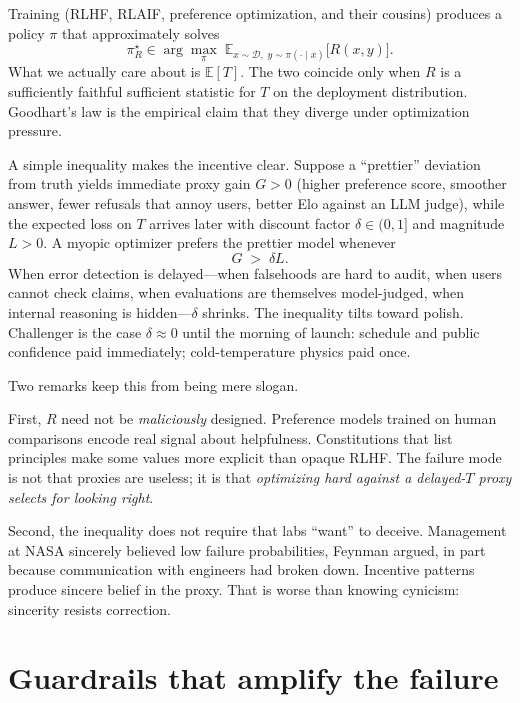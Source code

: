 \documentclass[11pt]{article}
\begin{document}
Training (RLHF, RLAIF, preference optimization, and their cousins) produces a policy \(\pi\) that approximately solves
\begin{equation}
\pi^\star_R \in \arg\max_\pi \; \mathbb{E}_{x\sim\mathcal{D},\; y\sim\pi(\cdot\mid x)}\bigl[R(x,y)\bigr].
\end{equation}
What we actually care about is \(\mathbb{E}[T]\). The two coincide only when \(R\) is a sufficiently faithful sufficient statistic for \(T\) on the deployment distribution. Goodhart's law is the empirical claim that they diverge under optimization pressure.

A simple inequality makes the incentive clear. Suppose a ``prettier'' deviation from truth yields immediate proxy gain \(G > 0\) (higher preference score, smoother answer, fewer refusals that annoy users, better Elo against an LLM judge), while the expected loss on \(T\) arrives later with discount factor \(\delta \in (0,1]\) and magnitude \(L > 0\). A myopic optimizer prefers the prettier model whenever
\begin{equation}
G \;>\; \delta L.
\end{equation}
When error detection is delayed---when falsehoods are hard to audit, when users cannot check claims, when evaluations are themselves model-judged, when internal reasoning is hidden---\(\delta\) shrinks. The inequality tilts toward polish. Challenger is the case \(\delta \approx 0\) until the morning of launch: schedule and public confidence paid immediately; cold-temperature physics paid once.

Two remarks keep this from being mere slogan.

First, \(R\) need not be \emph{maliciously} designed. Preference models trained on human comparisons \cite{christiano2017,ouyang2022} encode real signal about helpfulness. Constitutions that list principles \cite{bai2022} make some values more explicit than opaque RLHF. The failure mode is not that proxies are useless; it is that \emph{optimizing hard against a delayed-\(T\) proxy selects for looking right}.

Second, the inequality does not require that labs ``want'' to deceive. Management at NASA sincerely believed low failure probabilities, Feynman argued, in part because communication with engineers had broken down. Incentive patterns produce sincere belief in the proxy. That is worse than knowing cynicism: sincerity resists correction.

\section{Guardrails that amplify the failure}
\end{document}
